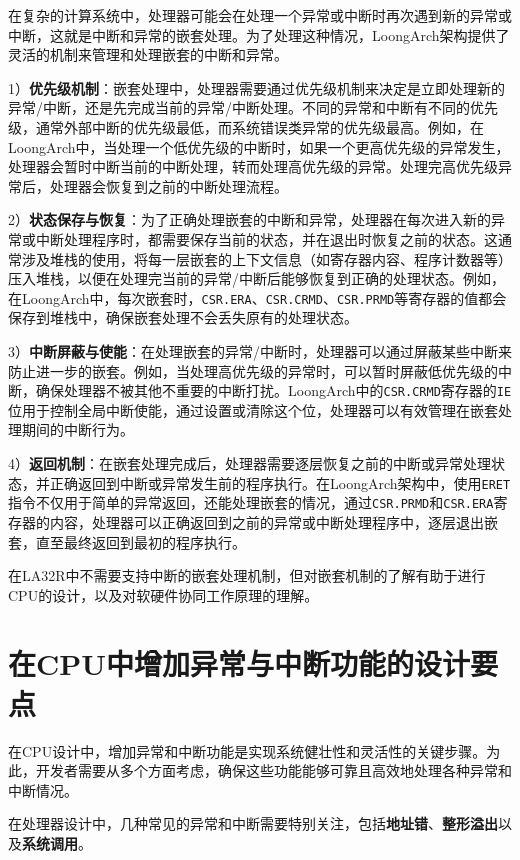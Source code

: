 在复杂的计算系统中，处理器可能会在处理一个异常或中断时再次遇到新的异常或中断，这就是中断和异常的嵌套处理。为了处理这种情况，LoongArch架构提供了灵活的机制来管理和处理嵌套的中断和异常。

1）\textbf{优先级机制}：嵌套处理中，处理器需要通过优先级机制来决定是立即处理新的异常/中断，还是先完成当前的异常/中断处理。不同的异常和中断有不同的优先级，通常外部中断的优先级最低，而系统错误类异常的优先级最高。例如，在LoongArch中，当处理一个低优先级的中断时，如果一个更高优先级的异常发生，处理器会暂时中断当前的中断处理，转而处理高优先级的异常。处理完高优先级异常后，处理器会恢复到之前的中断处理流程。

2）\textbf{状态保存与恢复}：为了正确处理嵌套的中断和异常，处理器在每次进入新的异常或中断处理程序时，都需要保存当前的状态，并在退出时恢复之前的状态。这通常涉及堆栈的使用，将每一层嵌套的上下文信息（如寄存器内容、程序计数器等）压入堆栈，以便在处理完当前的异常/中断后能够恢复到正确的处理状态。例如，在LoongArch中，每次嵌套时，\texttt{CSR.ERA}、\texttt{CSR.CRMD}、\texttt{CSR.PRMD}等寄存器的值都会保存到堆栈中，确保嵌套处理不会丢失原有的处理状态。

3）\textbf{中断屏蔽与使能}：在处理嵌套的异常/中断时，处理器可以通过屏蔽某些中断来防止进一步的嵌套。例如，当处理高优先级的异常时，可以暂时屏蔽低优先级的中断，确保处理器不被其他不重要的中断打扰。LoongArch中的\texttt{CSR.CRMD}寄存器的\texttt{IE}位用于控制全局中断使能，通过设置或清除这个位，处理器可以有效管理在嵌套处理期间的中断行为。

4）\textbf{返回机制}：在嵌套处理完成后，处理器需要逐层恢复之前的中断或异常处理状态，并正确返回到中断或异常发生前的程序执行。在LoongArch架构中，使用\texttt{ERET}指令不仅用于简单的异常返回，还能处理嵌套的情况，通过\texttt{CSR.PRMD}和\texttt{CSR.ERA}寄存器的内容，处理器可以正确返回到之前的异常或中断处理程序中，逐层退出嵌套，直至最终返回到最初的程序执行。

在LA32R中不需要支持中断的嵌套处理机制，但对嵌套机制的了解有助于进行CPU的设计，以及对软硬件协同工作原理的理解。

\section{在CPU中增加异常与中断功能的设计要点}\label{sec:07-exceptions-016}

在CPU设计中，增加异常和中断功能是实现系统健壮性和灵活性的关键步骤。为此，开发者需要从多个方面考虑，确保这些功能能够可靠且高效地处理各种异常和中断情况。

在处理器设计中，几种常见的异常和中断需要特别关注，包括\textbf{地址错}、\textbf{整形溢出}以及\textbf{系统调用}。

